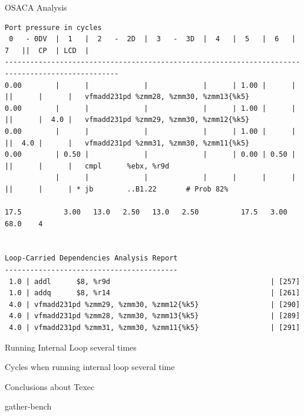 \documentclass[aspectratio=169,t]{beamer}
\begin{document}
  \begin{frame}[fragile]{OSACA Analysis}
    \vspace{-20pt}
    \begin{lstlisting}[basicstyle=\tt\fontsize{4pt}{6pt}\selectfont]
                                     Port pressure in cycles
 0   - 0DV  |  1   |  2   -  2D  |  3   -  3D  |  4   |  5   |  6   |  7   ||  CP  | LCD  |
-------------------------------------------------------------------------------------------------
0.00        |      |             |             |      | 1.00 |      |      ||      |      |   vfmadd231pd %zmm28, %zmm30, %zmm13{%k5}
0.00        |      |             |             |      | 1.00 |      |      ||      |  4.0 |   vfmadd231pd %zmm29, %zmm30, %zmm12{%k5}
0.00        |      |             |             |      | 1.00 |      |      ||  4.0 |      |   vfmadd231pd %zmm31, %zmm30, %zmm11{%k5}
0.00        | 0.50 |             |             |      | 0.00 | 0.50 |      ||      |      |   cmpl      %ebx, %r9d
            |      |             |             |      |      |      |      ||      |      | * jb        ..B1.22       # Prob 82%

17.5          3.00   13.0   2.50   13.0   2.50          17.5   3.00           68.0    4


Loop-Carried Dependencies Analysis Report
-----------------------------------------
 1.0 | addl      $8, %r9d                                      | [257]
 1.0 | addq      $8, %r14                                      | [261]
 4.0 | vfmadd231pd %zmm29, %zmm30, %zmm12{%k5}                 | [290]
 4.0 | vfmadd231pd %zmm28, %zmm30, %zmm13{%k5}                 | [289]
 4.0 | vfmadd231pd %zmm31, %zmm30, %zmm11{%k5}                 | [291]
    \end{lstlisting}
  \end{frame}

  \begin{frame}[fragile]{Running Internal Loop several times}
  \end{frame}

  \begin{frame}[fragile]{Cycles when running internal loop several time}
  \end{frame}

  \begin{frame}[fragile]{Conclusions about Texec}
  \end{frame}

  \begin{frame}[fragile]{gather-bench}
  \end{frame}
\end{document}
